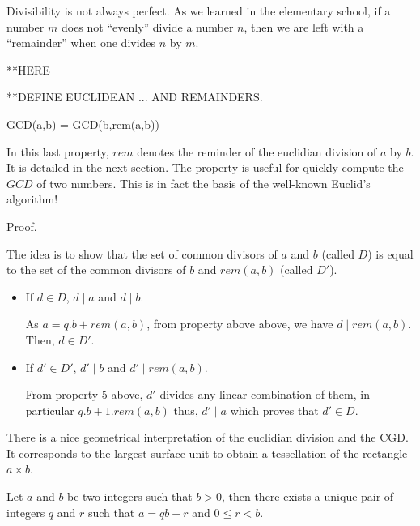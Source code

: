 Divisibility is not always perfect.  As we learned in the elementary
school, if a number $m$ does not ``evenly'' divide a number $n$, then
we are left with a ``remainder'' when one divides $n$ by $m$.

**HERE

**DEFINE EUCLIDEAN ... AND REMAINDERS.


 GCD(a,b) = GCD(b,rem(a,b))

In this last property, $rem$ denotes the reminder of the euclidian division of $a$ by $b$. 
It is detailed in the next section. 
The property is useful for quickly compute the $GCD$ of two numbers. 
This is in fact the basis of the well-known Euclid’s algorithm!

Proof.

The idea is to show that the set of common divisors of $a$ and $b$ (called $D$) is equal to the set
of the common divisors of $b$ and $rem(a,b)$ (called $D'$).
\begin{itemize}
\item If $d \in D$, $d \mid a$ and $d \mid b$.

As $a=q.b+rem(a,b)$, from property above above, we have $d \mid rem(a,b)$. Then, $d \in D'$.
\item If $d' \in D'$, $d' \mid b$ and $d' \mid rem(a,b)$.

From property $5$ above, $d'$ divides any linear combination of them, in particular $q.b+1.rem(a,b)$
thus,  $d' \mid a$ which proves that $d' \in D$.
\end{itemize}


There is a nice geometrical interpretation of the euclidian division and the CGD.
It corresponds to the largest surface unit to obtain a tessellation of the rectangle $a \times b$. 




\medskip

Let $a$ and $b$ be two integers such that $b>0$, 
then there exists a unique pair of integers $q$ and $r$ such that $a=qb+r$ and $0 \leq r < b$.

